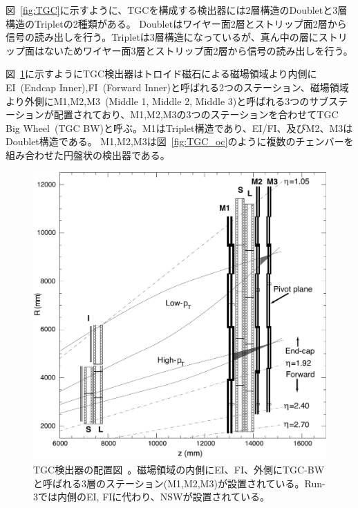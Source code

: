 図~\ref{fig:TGC}に示すように、TGCを構成する検出器には2層構造のDoubletと3層構造のTripletの2種類がある。
Doubletはワイヤー面2層とストリップ面2層から信号の読み出しを行う。Tripletは3層構造になっているが、真ん中の層にストリップ面はないためワイヤー面3層とストリップ面2層から信号の読み出しを行う。

図~\ref{fig:TGC_st}に示すようにTGC検出器はトロイド磁石による磁場領域より内側にEI~(Endcap Inner),FI~(Forward Inner)と呼ばれる2つのステーション、磁場領域より外側にM1,M2,M3~(Middle 1, Middle 2, Middle 3)と呼ばれる3つのサブステーションが配置されており、M1,M2,M3の3つのステーションを合わせてTGC Big Wheel~(TGC BW)と呼ぶ。M1はTriplet構造であり、EI/FI、及びM2、M3はDoublet構造である。
M1,M2,M3は図~\ref{fig:TGC_oc}のように複数のチェンバーを組み合わせた円盤状の検出器である。
\begin{figure}[tb]
  \centering
  \includegraphics[clip, width=14cm]{fig/2/l1mue-schema.pdf}
  \caption{TGC検出器の配置図~\cite{Aad:1129811}。磁場領域の内側にEI、FI、外側にTGC-BWと呼ばれる3層のステーション(M1,M2,M3)が設置されている。Run-3では内側のEI,
  FIに代わり、NSWが設置されている。}
  \label{fig:TGC_st}
\end{figure}

